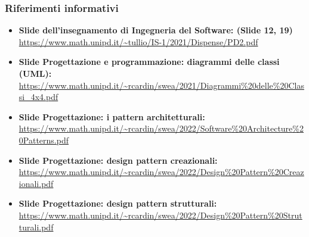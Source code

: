 \subsubsection{Riferimenti informativi}
\begin{itemize}
	\item 
    {\textbf{Slide dell'insegnamento di Ingegneria del Software: (Slide 12, 19)}}\\\url{https://www.math.unipd.it/~tullio/IS-1/2021/Dispense/PD2.pdf}
	\item
	{\textbf{Slide Progettazione e programmazione: diagrammi delle classi (UML):}}\\\url{https://www.math.unipd.it/~rcardin/swea/2021/Diagrammi%20delle%20Classi_4x4.pdf}
	\item
	{\textbf{Slide Progettazione: i pattern architetturali:}}\\\url{https://www.math.unipd.it/~rcardin/swea/2022/Software%20Architecture%20Patterns.pdf}
	\item 
	{\textbf{Slide Progettazione: design pattern creazionali:}}\\\url{https://www.math.unipd.it/~rcardin/swea/2022/Design%20Pattern%20Creazionali.pdf}
	\item 
	{\textbf{Slide Progettazione: design pattern strutturali:}}\\\url{https://www.math.unipd.it/~rcardin/swea/2022/Design%20Pattern%20Strutturali.pdf}
\end{itemize}
